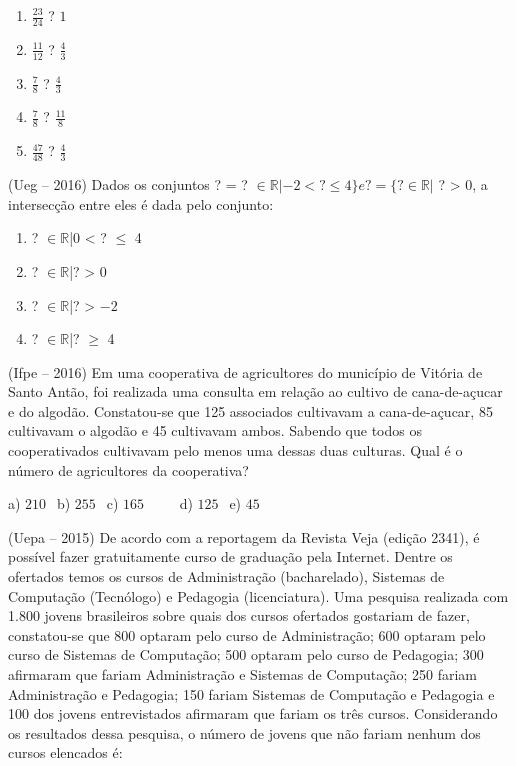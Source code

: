 \begin{multicols*}{2}
\begin{enumerate}
			      \item $ \frac{23}{24}$ ? $ 1 $
			      \item $ \frac{11}{12}$ ? $ \frac{4}{3} $
			      \item $ \frac{7}{8}$ ? $ \frac{4}{3} $
			      \item $ \frac{7}{8}$ ? $ \frac{11}{8} $
			      \item $ \frac{47}{48}$ ? $ \frac{4}{3} $

		      \end{enumerate}

		\execnum (Ueg – 2016) Dados os conjuntos ? = {? $\in \mathbb{R}|-2 <  ?  \leq 4\} e ? = \{? \in \mathbb{R}|$ ? > 0}, a intersecção entre eles é dada pelo conjunto:

		      \begin{enumerate}

			      \item {? $\in \mathbb{R}$|0 < ? $\leq$ 4}
			      \item {? $\in \mathbb{R}$|? > 0}
			      \item {? $\in \mathbb{R}$|? > $ -2 $}
			      \item {? $\in \mathbb{R}$|? $\geq$ 4}

		      \end{enumerate}

		\execnum (Ifpe – 2016) Em uma cooperativa de agricultores do município de Vitória de Santo Antão, foi realizada uma consulta em relação ao cultivo de cana-de-açucar e do algodão. Constatou-se que 125 associados cultivavam a cana-de-açucar, 85 cultivavam o algodão e 45 cultivavam ambos. Sabendo que todos os cooperativados cultivavam pelo menos uma dessas duas culturas. Qual é o número de agricultores da cooperativa?

		      a) $210 \ \ $ b) $255 \ \ $ c) $165 \ \ \ \ \ \ \ \ \ \ $ d) $125 \ \ $ e) $45 \ \ $

		\execnum (Uepa – 2015) De acordo com a reportagem da Revista Veja (edição 2341), é possível fazer gratuitamente curso de graduação pela Internet. Dentre os ofertados temos os cursos de Administração (bacharelado), Sistemas de Computação (Tecnólogo) e Pedagogia (licenciatura). Uma pesquisa realizada com 1.800 jovens brasileiros sobre quais dos cursos ofertados gostariam de fazer, constatou-se que 800 optaram pelo curso de Administração; 600 optaram pelo curso de Sistemas de Computação; 500 optaram pelo curso de Pedagogia; 300 afirmaram que fariam Administração e Sistemas de Computação; 250 fariam Administração e Pedagogia; 150 fariam Sistemas de Computação e Pedagogia e 100 dos jovens entrevistados afirmaram que fariam os três cursos. Considerando os resultados dessa pesquisa, o número de jovens que não fariam nenhum dos cursos elencados é:


\end{multicols*}
